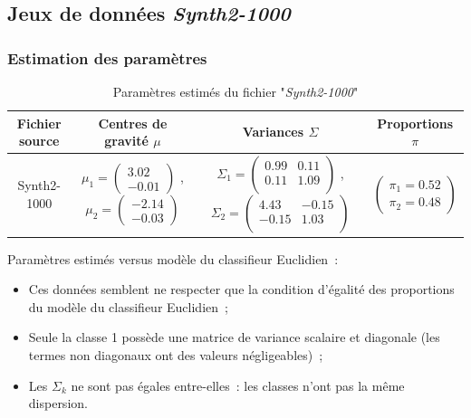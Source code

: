 \documentclass[a4paper,10pt]{report}
\begin{document}
\subsection{Jeux de données \textit{Synth2-1000}}
\label{subsection:estimation-erreur-synth2}
\subsubsection{Estimation des paramètres}


\begin{table}[H]
	\centering
	\begin{tabular}{c|c|c|c}
		Fichier source & Centres de gravité $\mu$ & Variances $\Sigma$ & Proportions $\pi$ \\ 
		\hline
		\small Synth2-1000 
		& 	$\mu_{1} = 
		\begin{pmatrix}
		3.02 \\ 
		-0.01
		\end{pmatrix} $ , 
		$\mu_{2} = 
		\begin{pmatrix}
		-2.14 \\ 
		-0.03
		\end{pmatrix} $ 
		&  	$\Sigma_{1} = 
		\begin{pmatrix}
		0.99 & 0.11 \\
		0.11 & 1.09\\
		\end{pmatrix} $ , 
		$\Sigma_{2} = 
		\begin{pmatrix}
		4.43 & -0.15\\
		-0.15 & 1.03 \\
		\end{pmatrix} $
		& 	$\begin{pmatrix} 
		\pi_{1} = 0.52\\
		\pi_{2} = 0.48
		\end{pmatrix}$\\ 
	\end{tabular}
	\caption{\small Paramètres estimés du fichier "\textit{Synth2-1000}"}
	\label{table:1-2-parametres-Synth2}
\end{table}



Paramètres estimés versus modèle du classifieur Euclidien~:
\begin{itemize}
	\item Ces données semblent ne respecter que la condition d'égalité des proportions du modèle du classifieur Euclidien~;
	\item Seule la classe 1 possède une matrice de variance scalaire et diagonale (les termes non diagonaux ont des valeurs négligeables)~;
	\item Les $\Sigma_k$ ne sont pas égales entre-elles~: les classes n'ont pas la même dispersion.
\end{itemize}
\end{document}
